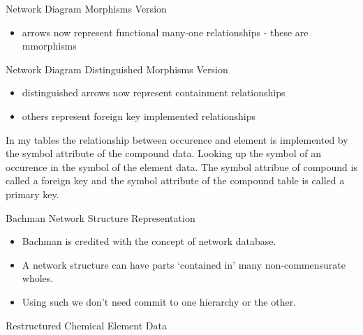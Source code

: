 \begin{frame}{Network Diagram Morphisms Version}

\begin{itemize}
	\item arrows now represent functional many-one relationships - these are mmorphisms
\end{itemize}
\end{frame}


\begin{frame}{Network Diagram Distinguished Morphisms Version}
\begin{itemize}
	\item distinguished arrows now represent containment relationships
	\item others represent foreign key implemented relationships
\end{itemize}
\end{frame}

\begin{frame} 
In my tables the relationship between occurence and element is implemented by the symbol attribute of the compound data.
Looking up the symbol of an occurence in the symbol of the element data.
The symbol attribue of compound is called a foreign key
and the symbol attribute of the compound table is called a primary key. 
\end{frame}

\begin{frame}{Bachman Network Structure Representation}
\begin{itemize}
	\item Bachman is credited with the concept of network database.
    \item A network structure can have parts `contained in' many non-commensurate wholes.
    \item Using such we don't need commit to one hierarchy or the other. 
 \end{itemize}
\end{frame}

\begin{frame}{Restructured Chemical Element Data}
\scalebox{0.75}{

}
\end{frame}

